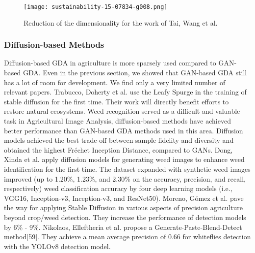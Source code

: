 \documentclass[preprint,12pt,authoryear]{elsarticle}
\begin{document}
\begin{figure}
    \centering
    \centerline{\texttt{[image: sustainability-15-07834-g008.png]}}
    \caption{Reduction of the dimensionality for the work of Tai, Wang et al.}
    \label{fig:enter-label}
\end{figure}

\subsubsection{Diffusion-based Methods}

Diffusion-based GDA in agriculture is more sparsely used compared to GAN-based GDA. Even in the previous section, we showed that GAN-based GDA still has a lot of room for development. We find only a very limited number of relevant papers. Trabucco, Doherty et al. use the Leafy Spurge in the training of stable diffusion for the first time\cite{apl55}. Their work will directly benefit efforts to restore natural ecosystems. Weed recognition served as a difficult and valuable task in Agricultural Image Analysis, diffusion-based methods have achieved better performance than GAN-based GDA methods used in this area. Diffusion models achieved the best trade-off between sample fidelity and diversity and obtained the highest Fréchet Inception Distance, compared to GANs\cite{apl56}. Dong, Xinda et al. apply diffusion models for generating weed images to enhance weed identification for the first time. The dataset expanded with synthetic weed images improved (up to 1.20\%, 1.23\%, and 2.30\% on the accuracy, precision, and recall, respectively) weed classification accuracy by four deep learning models (i.e., VGG16, Inception-v3, Inception-v3, and ResNet50)\cite{apl58}. Moreno, Gómez et al. pave the way for applying Stable Diffusion in various aspects of precision agriculture beyond crop/weed detection\cite{apl57}. They increase the performance of detection models by 6\% - 9\%. Nikolaos, Elleftheria et al. propose a Generate-Paste-Blend-Detect method[59]. They achieve a mean average precision of 0.66 for whiteflies detection with the YOLOv8 detection model.
\end{document}
